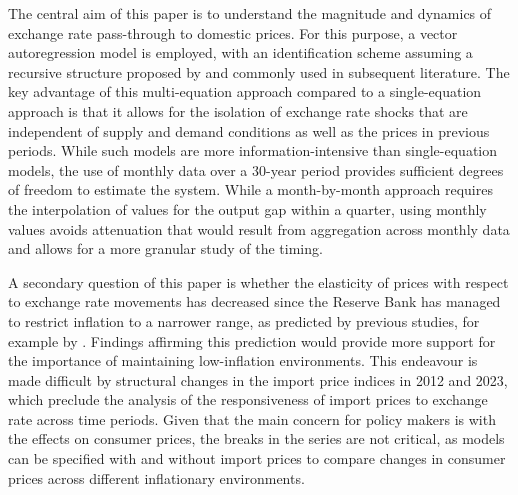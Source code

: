 \documentclass[12pt]{article}
\begin{document}
 The central aim of this paper is to understand the magnitude and dynamics of exchange rate pass-through to domestic prices. For this purpose, a vector autoregression model is employed, with an identification scheme assuming a recursive structure proposed by \textcite{mccarthy1999} and commonly used in subsequent literature. The key advantage of this multi-equation approach compared to a single-equation approach is that it allows for the isolation of exchange rate shocks that are independent of supply and demand conditions as well as the prices in previous periods. While such models are more information-intensive than single-equation models, the use of monthly data over a 30-year period provides sufficient degrees of freedom to estimate the system. While a month-by-month approach requires the interpolation of values for the output gap within a quarter, using monthly values avoids attenuation that would result from aggregation across monthly data and allows for a more granular study of the timing. 
 
 A secondary question of this paper is whether the elasticity of prices with respect to exchange rate movements has decreased since the Reserve Bank has managed to restrict inflation to a narrower range, as predicted by previous studies, for example by \textcite{taylor2000low}. Findings affirming this prediction would provide more support for the importance of maintaining low-inflation environments. This endeavour is made difficult by structural changes in the import price indices in 2012 and 2023, which preclude the analysis of the responsiveness of import prices to exchange rate across time periods. Given that the main concern for policy makers is with the effects on consumer prices, the breaks in the series are not critical, as models can be specified with and without import prices to compare changes in consumer prices across different inflationary environments. 
 
\end{document}
